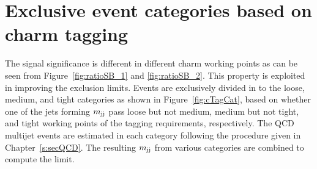 \section{Exclusive event categories based on charm tagging}
\label{ss:mjj_cTagEx}
The signal significance is different in different charm working points as can 
be seen from Figure~\ref{fig:ratioSB_1} and \ref{fig:ratioSB_2}. This property is 
exploited in improving the exclusion limits. Events are exclusively divided in to 
the loose, medium, and tight categories as shown in Figure~\ref{fig:cTagCat}, based 
on whether one of the jets forming $m_\text{jj}$ pass loose but not medium, medium but not tight, 
and tight working points of the \PQc tagging requirements, respectively. The QCD multijet
events are estimated in each category following the procedure given in Chapter~\ref{s:secQCD}. 
The resulting $m_\text{jj}$ from various categories are combined to compute the limit. 
